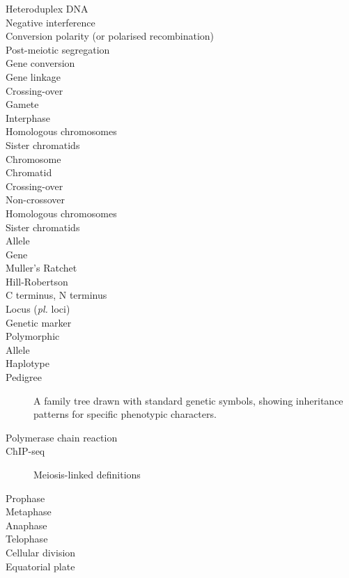 \begin{alwayssingle}
\begin{description}
		\item[Heteroduplex DNA]
		\item[Negative interference]
		\item[Conversion polarity (or polarised recombination)]
		\item[Post-meiotic segregation]
		\item[Gene conversion]
		\item[Gene linkage]
		\item[Crossing-over]
		\item[Gamete]
		\item[Interphase]
		\item[Homologous chromosomes]
		\item[Sister chromatids]
		\item[Chromosome]
		\item[Chromatid]
		\item[Crossing-over]
		\item[Non-crossover]
		\item[Homologous chromosomes]
		\item[Sister chromatids]
		\item[Allele]
		\item[Gene]
		\item[Muller's Ratchet]
		\item[Hill-Robertson]
		\item[C terminus, N terminus]
		\item[Locus (\textit{pl.} loci)]
		\item[Genetic marker]
		\item[Polymorphic]
		\item[Allele]
		\item[Haplotype]
		\item[Pedigree] A family tree drawn with standard genetic symbols, showing inheritance patterns for specific phenotypic characters.
		\item[Polymerase chain reaction]
		\item[ChIP-seq]


Meiosis-linked definitions
\item[Prophase]
\item[Metaphase]
\item[Anaphase]
\item[Telophase]
\item[Cellular division]
\item[Equatorial plate]





	\end{description}
\end{alwayssingle}
\mtcaddchapter{}


